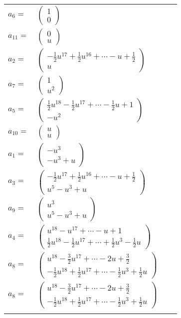 \documentclass[1p]{elsarticle_modified}
\theoremstyle{definition}
\begin{document}
\begin{tabular}{m{7pt} m{180pt} m{7pt} m{180pt} }
\flushright $a_{6}=$&$\begin{pmatrix}1\\0\end{pmatrix}$ \\
\flushright $a_{11}=$&$\begin{pmatrix}0\\u\end{pmatrix}$ \\
\flushright $a_{2}=$&$\begin{pmatrix}-\frac{1}{2} u^{17}+\frac{1}{2} u^{16}+\cdots- u+\frac{1}{2}\\u\end{pmatrix}$ \\
\flushright $a_{7}=$&$\begin{pmatrix}1\\u^2\end{pmatrix}$ \\
\flushright $a_{5}=$&$\begin{pmatrix}\frac{1}{2} u^{18}-\frac{1}{2} u^{17}+\cdots-\frac{1}{2} u+1\\- u^2\end{pmatrix}$ \\
\flushright $a_{10}=$&$\begin{pmatrix}u\\u\end{pmatrix}$ \\
\flushright $a_{1}=$&$\begin{pmatrix}- u^3\\- u^3+u\end{pmatrix}$ \\
\flushright $a_{3}=$&$\begin{pmatrix}-\frac{1}{2} u^{17}+\frac{1}{2} u^{16}+\cdots- u+\frac{1}{2}\\u^5- u^3+u\end{pmatrix}$ \\
\flushright $a_{9}=$&$\begin{pmatrix}u^3\\u^5- u^3+u\end{pmatrix}$ \\
\flushright $a_{4}=$&$\begin{pmatrix}u^{18}- u^{17}+\cdots- u+1\\\frac{1}{2} u^{18}-\frac{1}{2} u^{17}+\cdots+\frac{1}{2} u^3-\frac{1}{2} u\end{pmatrix}$ \\
\flushright $a_{8}=$&$\begin{pmatrix}u^{18}-\frac{3}{2} u^{17}+\cdots-2 u+\frac{3}{2}\\-\frac{1}{2} u^{18}+\frac{1}{2} u^{17}+\cdots-\frac{1}{2} u^3+\frac{1}{2} u\end{pmatrix}$\\ \flushright $a_{8}=$&$\begin{pmatrix}u^{18}-\frac{3}{2} u^{17}+\cdots-2 u+\frac{3}{2}\\-\frac{1}{2} u^{18}+\frac{1}{2} u^{17}+\cdots-\frac{1}{2} u^3+\frac{1}{2} u\end{pmatrix}$\\&\end{tabular}
\end{document}
